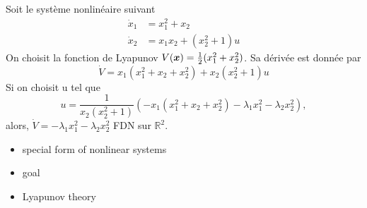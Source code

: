 \begin{example}
	Soit le système nonlinéaire suivant 
	\begin{align*}
		\dot{x}_1 &= x_1^2 + x_2 \\
		\dot{x}_2 &= x_1x_2 + (x_2^2+1)u
	\end{align*}
	On choisit la fonction de Lyapunov $V(\bm{x}) = \frac{1}{2}(x_1^2 + x_2^2)$. Sa dérivée est donnée par 
	\begin{equation*}
		\dot{V} = x_1(x_1^2 + x_2 + x_2^2) + x_2(x_2^2 +1)u
	\end{equation*}
	Si on  choisit  u tel que 
	\begin{equation}\label{eq-chap3:nnlinear feedback 2}
		u=\frac{1}{x_2(x_2^2+1)}\left(-x_1(x_1^2 + x_2 + x_2^2)  - \lambda_1x_1^2 -\lambda_2x_2^2\right),
	\end{equation}
	alors, $\dot{V} = - \lambda_1x_1^2 -\lambda_2x_2^2$ FDN sur $\mathbb{R}^2$. 
\end{example}
\begin{itemize}
	\item special form of nonlinear systems
	\item goal
	\item Lyapunov theory
	
\end{itemize}